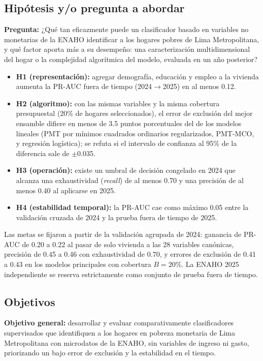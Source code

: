 \subsection{Hipótesis y/o pregunta a abordar}

\textbf{Pregunta:} ¿Qué tan eficazmente puede un clasificador basado en variables no monetarias de la ENAHO identificar a los hogares pobres de Lima Metropolitana, y qué factor aporta más a su desempeño: una caracterización multidimensional del hogar o la complejidad algorítmica del modelo, evaluada en un año posterior?

\begin{itemize}
    \item \textbf{H1 (representación):} agregar demografía, educación y empleo a la vivienda aumenta la PR-AUC fuera de tiempo (2024$\rightarrow$2025) en al menos 0.12.
    \item \textbf{H2 (algoritmo):} con las mismas variables y la misma cobertura presupuestal (20\% de hogares seleccionados), el error de exclusión del mejor ensamble difiere en menos de 3.5 puntos porcentuales del de los modelos lineales (PMT por mínimos cuadrados ordinarios regularizados, PMT-MCO, y regresión logística); se refuta si el intervalo de confianza al 95\% de la diferencia sale de $\pm$0.035.
    \item \textbf{H3 (operación):} existe un umbral de decisión congelado en 2024 que alcanza una exhaustividad (\textit{recall}) de al menos 0.70 y una precisión de al menos 0.40 al aplicarse en 2025.
    \item \textbf{H4 (estabilidad temporal):} la PR-AUC cae como máximo 0.05 entre la validación cruzada de 2024 y la prueba fuera de tiempo de 2025.
\end{itemize}

Las metas se fijaron a partir de la validación agrupada de 2024: ganancia de PR-AUC de 0.20 a 0.22 al pasar de solo vivienda a las 28 variables canónicas, precisión de 0.45 a 0.46 con exhaustividad de 0.70, y errores de exclusión de 0.41 a 0.43 en los modelos principales con cobertura $B = 20$\%. La ENAHO 2025 independiente se reserva estrictamente como conjunto de prueba fuera de tiempo.

\subsection{Objetivos}

\textbf{Objetivo general:} desarrollar y evaluar comparativamente clasificadores supervisados que identifiquen a los hogares en pobreza monetaria de Lima Metropolitana con microdatos de la ENAHO, sin variables de ingreso ni gasto, priorizando un bajo error de exclusión y la estabilidad en el tiempo.

